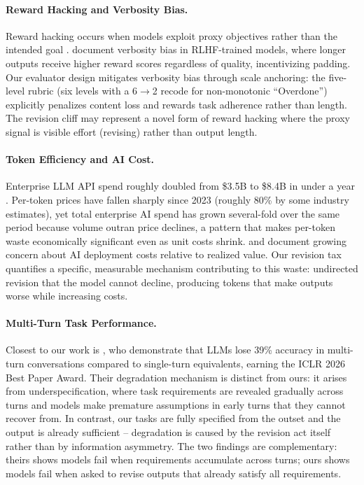 \paragraph{Reward Hacking and Verbosity Bias.}
Reward hacking occurs when models exploit proxy objectives rather than the intended goal \cite{skalse2022defining}. \citet{singhal2023long} document verbosity bias in RLHF-trained models, where longer outputs receive higher reward scores regardless of quality, incentivizing padding. Our evaluator design mitigates verbosity bias through scale anchoring: the five-level rubric (six levels with a 6$\to$2 recode for non-monotonic ``Overdone'') explicitly penalizes content loss and rewards task adherence rather than length. The revision cliff may represent a novel form of reward hacking where the proxy signal is visible effort (revising) rather than output length.

\paragraph{Token Efficiency and AI Cost.}
Enterprise LLM API spend roughly doubled from \$3.5B to \$8.4B in under a year \cite{menlo2025llmmarket}. Per-token prices have fallen sharply since 2023 (roughly 80\% by some industry estimates), yet total enterprise AI spend has grown several-fold over the same period because volume outran price declines, a pattern that makes per-token waste economically significant even as unit costs shrink. \citet{deloitte2026stateofai} and \citet{mckinsey2025stateofai} document growing concern about AI deployment costs relative to realized value. Our revision tax quantifies a specific, measurable mechanism contributing to this waste: undirected revision that the model cannot decline, producing tokens that make outputs worse while increasing costs.

\paragraph{Multi-Turn Task Performance.}
Closest to our work is \citet{laban2025lost}, who demonstrate that LLMs lose 39\% accuracy in multi-turn conversations compared to single-turn equivalents, earning the ICLR 2026 Best Paper Award. Their degradation mechanism is distinct from ours: it arises from underspecification, where task requirements are revealed gradually across turns and models make premature assumptions in early turns that they cannot recover from. In contrast, our tasks are fully specified from the outset and the output is already sufficient -- degradation is caused by the revision act itself rather than by information asymmetry. The two findings are complementary: theirs shows models fail when requirements accumulate across turns; ours shows models fail when asked to revise outputs that already satisfy all requirements.
